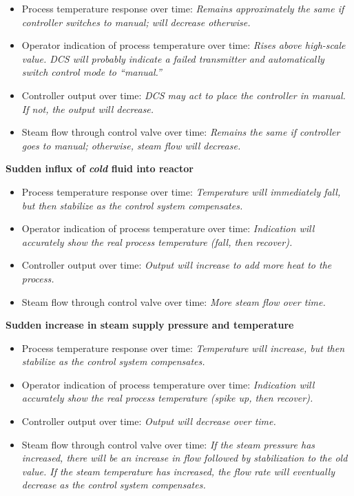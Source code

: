 \begin{itemize}
\item{} Process temperature response over time: {\it Remains approximately the same if controller switches to manual; will decrease otherwise.}
\vskip 5pt
\item{} Operator indication of process temperature over time: {\it Rises above high-scale value.  DCS will probably indicate a failed transmitter and automatically switch control mode to ``manual.''}
\vskip 5pt
\item{} Controller output over time: {\it DCS may act to place the controller in manual.  If not, the output will decrease.}
\vskip 5pt
\item{} Steam flow through control valve over time: {\it Remains the same if controller goes to manual; otherwise, steam flow will decrease.}
\end{itemize}

\vskip 10pt

\noindent
{\bf Sudden influx of {\it cold} fluid into reactor}

\begin{itemize}
\item{} Process temperature response over time: {\it Temperature will immediately fall, but then stabilize as the control system compensates.}
\vskip 5pt
\item{} Operator indication of process temperature over time: {\it Indication will accurately show the real process temperature (fall, then recover).}
\vskip 5pt
\item{} Controller output over time: {\it Output will increase to add more heat to the process.}
\vskip 5pt
\item{} Steam flow through control valve over time: {\it More steam flow over time.}
\end{itemize}

\vskip 10pt

\noindent
{\bf Sudden increase in steam supply pressure and temperature}

\begin{itemize}
\item{} Process temperature response over time: {\it Temperature will increase, but then stabilize as the control system compensates.}
\vskip 5pt
\item{} Operator indication of process temperature over time: {\it Indication will accurately show the real process temperature (spike up, then recover).}
\vskip 5pt
\item{} Controller output over time: {\it Output will decrease over time.}
\vskip 5pt
\item{} Steam flow through control valve over time: {\it If the steam pressure has increased, there will be an increase in flow followed by stabilization to the old value.  If the steam temperature has increased, the flow rate will eventually decrease as the control system compensates.}
\end{itemize}




